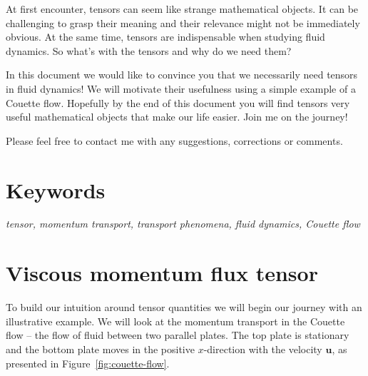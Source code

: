 \documentclass[10pt,twocolumn]{article}
\begin{document}
At first encounter, tensors can seem like strange mathematical objects. It can be challenging to grasp their meaning and their relevance might not be immediately obvious. At the same time, tensors are indispensable when studying fluid dynamics. So what's with the tensors and why do we need them?

In this document we would like to convince you that we necessarily need tensors in fluid dynamics! We will motivate their usefulness using a simple example of a Couette flow. Hopefully by the end of this document you will find tensors very useful mathematical objects that make our life easier. Join me on the journey!

Please feel free to contact me with any suggestions, corrections or comments.

\section*{Keywords}

\textit{tensor, momentum transport, transport phenomena, fluid dynamics, Couette flow}


\section*{Viscous momentum flux tensor}

To build our intuition around tensor quantities we will begin our journey with an illustrative example. We will look at the momentum transport in the Couette flow -- the flow of fluid between two parallel plates. The top plate is stationary and the bottom plate moves in the positive $x$-direction with the velocity $\mathbf{u}$, as presented in Figure~\ref{fig:couette-flow}.
\end{document}
